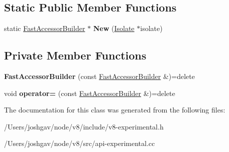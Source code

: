 \subsection*{Static Public Member Functions}
\begin{DoxyCompactItemize}
\item 
static \hyperlink{classv8_1_1experimental_1_1_fast_accessor_builder}{Fast\+Accessor\+Builder} $\ast$ {\bfseries New} (\hyperlink{classv8_1_1_isolate}{Isolate} $\ast$isolate)\hypertarget{classv8_1_1experimental_1_1_fast_accessor_builder_a08c581575cd9eda62d48c79c05900909}{}\label{classv8_1_1experimental_1_1_fast_accessor_builder_a08c581575cd9eda62d48c79c05900909}

\end{DoxyCompactItemize}
\subsection*{Private Member Functions}
\begin{DoxyCompactItemize}
\item 
{\bfseries Fast\+Accessor\+Builder} (const \hyperlink{classv8_1_1experimental_1_1_fast_accessor_builder}{Fast\+Accessor\+Builder} \&)=delete\hypertarget{classv8_1_1experimental_1_1_fast_accessor_builder_aad57de2056ac00fc77a8b9c5d9ff9951}{}\label{classv8_1_1experimental_1_1_fast_accessor_builder_aad57de2056ac00fc77a8b9c5d9ff9951}

\item 
void {\bfseries operator=} (const \hyperlink{classv8_1_1experimental_1_1_fast_accessor_builder}{Fast\+Accessor\+Builder} \&)=delete\hypertarget{classv8_1_1experimental_1_1_fast_accessor_builder_a9293ec9344bae9e233b9155651458f8c}{}\label{classv8_1_1experimental_1_1_fast_accessor_builder_a9293ec9344bae9e233b9155651458f8c}

\end{DoxyCompactItemize}


The documentation for this class was generated from the following files\+:\begin{DoxyCompactItemize}
\item 
/\+Users/joshgav/node/v8/include/v8-\/experimental.\+h\item 
/\+Users/joshgav/node/v8/src/api-\/experimental.\+cc\end{DoxyCompactItemize}
